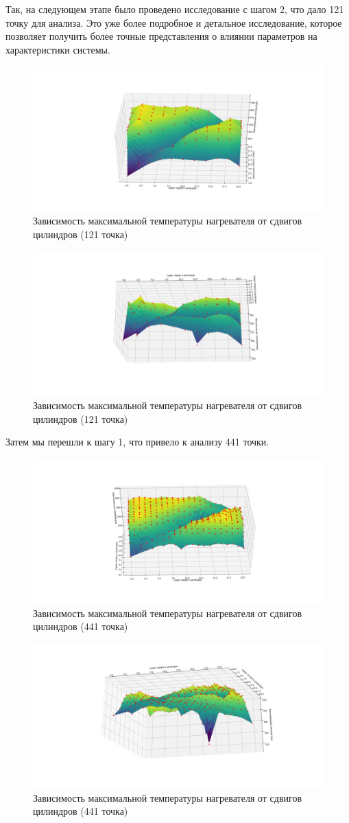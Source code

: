 \documentclass[a4paper,12pt]{extreport}
\numberwithin{equation}{chapter}
\begin{document}
Так, на следующем этапе было проведено исследование с шагом 2, что дало 121 точку для анализа.
Это уже более подробное и детальное исследование, которое позволяет получить более точные представления о влиянии параметров на характеристики системы.

\begin{figure}[h]
	\begin{center}
		\includegraphics[width=0.4\linewidth]{images/17.1.jpg}
		\caption{Зависимость максимальной температуры нагревателя от сдвигов цилиндров (121 точка)} %
	\end{center}
\end{figure}
\begin{figure}[h]
	\begin{center}
		\includegraphics[width=0.4\linewidth]{images/17.2.jpg}
		\caption{Зависимость максимальной температуры нагревателя от сдвигов цилиндров (121 точка)} %
	\end{center}
\end{figure}

Затем мы перешли к шагу 1, что привело к анализу 441 точки.

\begin{figure}[h]
	\begin{center}
		\includegraphics[width=0.4\linewidth]{images/18.1.jpg}
		\caption{Зависимость максимальной температуры нагревателя от сдвигов цилиндров (441 точка)} %
	\end{center}
\end{figure}
\begin{figure}[h]
	\begin{center}
		\includegraphics[width=0.4\linewidth]{images/18.2.jpg}
		\caption{Зависимость максимальной температуры нагревателя от сдвигов цилиндров (441 точка)} %
	\end{center}
\end{figure}
\end{document}
